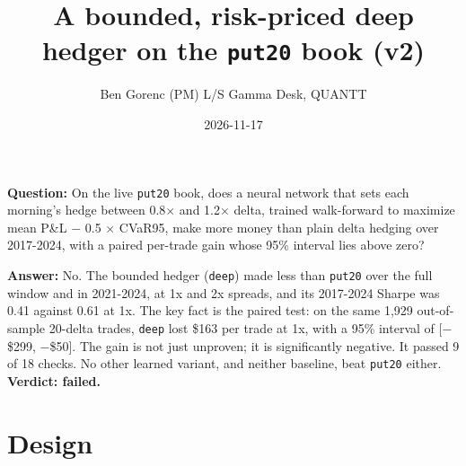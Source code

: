 \documentclass{article}
\title{A bounded, risk-priced deep hedger on the \texttt{put20} book (v2)}
\author{Ben Gorenc (PM) \textperiodcentered{} L/S Gamma Desk, QUANTT}
\date{2026-11-17}
\begin{document}
\maketitle

\textbf{Question:} On the live \texttt{put20} book, does a neural network that sets each morning's hedge between 0.8\ensuremath{\times} and 1.2\ensuremath{\times} delta, trained walk-forward to maximize mean P\&L $-$ 0.5 \ensuremath{\times} CVaR95, make more money than plain delta hedging over 2017-2024, with a paired per-trade gain whose 95\% interval lies above zero?

\textbf{Answer:} No. The bounded hedger (\texttt{deep}) made less than \texttt{put20} over the full window and in 2021-2024, at 1x and 2x spreads, and its 2017-2024 Sharpe was 0.41 against 0.61 at 1x. The key fact is the paired test: on the same 1,929 out-of-sample 20-delta trades, \texttt{deep} lost \$163 per trade at 1x, with a 95\% interval of [$-$\$299, $-$\$50]. The gain is not just unproven; it is significantly negative. It passed 9 of 18 checks. No other learned variant, and neither baseline, beat \texttt{put20} either. \textbf{Verdict: failed.}

\section{Design}
\end{document}
